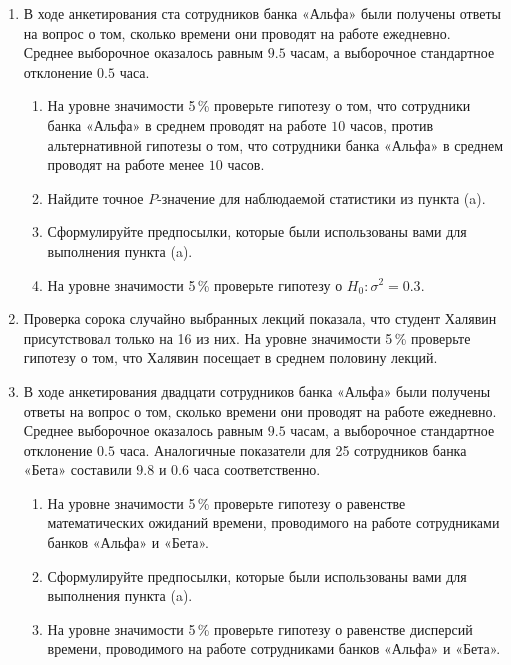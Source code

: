 \begin{enumerate}
\item В ходе анкетирования ста сотрудников банка «Альфа» были получены ответы на
вопрос о том, сколько времени они проводят на работе ежедневно. Среднее выборочное
оказалось равным $9.5$ часам, а выборочное стандартное отклонение $0.5$ часа.
\begin{enumerate}
  \item На уровне значимости 5\,\% проверьте гипотезу о том, что сотрудники банка
	«Альфа» в среднем проводят на работе $10$ часов, против альтернативной гипотезы о
	том, что сотрудники банка «Альфа» в среднем проводят на работе менее $10$ часов.
  \item Найдите точное $P$-значение для наблюдаемой статистики из пункта (a).
  \item Сформулируйте предпосылки, которые были использованы вами для выполнения
	пункта (a).
  \item На уровне значимости 5\,\% проверьте гипотезу о $H_0 \colon \sigma^2 = 0.3$.
\end{enumerate}


\item Проверка сорока случайно выбранных лекций показала, что студент Халявин
присутствовал только на 16 из них. На уровне значимости 5\,\% проверьте гипотезу
о том, что Халявин посещает в среднем половину лекций.

\item В ходе анкетирования двадцати сотрудников банка «Альфа» были получены ответы
на вопрос о том, сколько времени они проводят на работе ежедневно. Среднее выборочное
оказалось равным $9.5$ часам, а выборочное стандартное отклонение $0.5$ часа.
Аналогичные показатели для 25 сотрудников банка «Бета» составили $9.8$ и $0.6$
часа соответственно.
\begin{enumerate}
  \item На уровне значимости 5\,\% проверьте гипотезу о равенстве математических
	ожиданий времени, проводимого на работе сотрудниками банков «Альфа» и «Бета».
  \item Сформулируйте предпосылки, которые были использованы вами для выполнения
	пункта (a).
  \item На уровне значимости 5\,\% проверьте гипотезу о равенстве дисперсий времени,
	проводимого на работе сотрудниками банков «Альфа» и «Бета».
\end{enumerate}


\end{enumerate}
